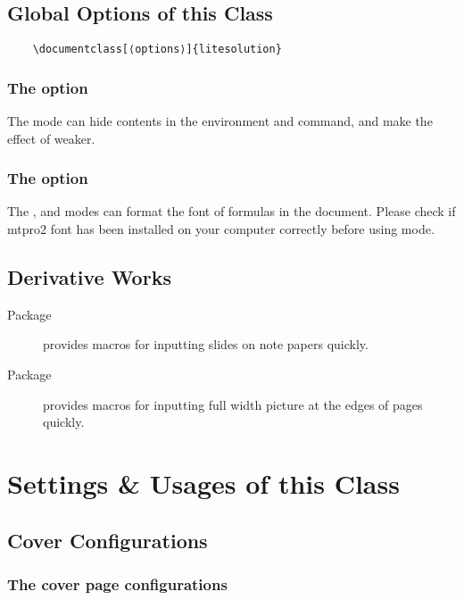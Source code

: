 \documentclass[mtpro2,twoside,openany]{litesolution}
\begin{document}
\section{Global Options of this Class}

\begin{verbatim}
    \documentclass[⟨options⟩]{litesolution}
\end{verbatim}

\subsection{The  option}

The  mode can hide contents in the  environment and  command, and make the effect of  weaker.

\subsection{The  option}

The ,  and  modes can format the font of formulas in the document. Please check if mtpro2 font has been installed on your computer correctly before using  mode.

\section{Derivative Works}
\begin{description}
    \item[Package ] provides macros for inputting slides on note papers quickly.
    \item[Package ] provides macros for inputting full width picture at the edges of pages quickly.
\end{description}

\chapter{Settings \& Usages of this Class}

\section{Cover Configurations}

\subsection{The cover page configurations}
\end{document}
